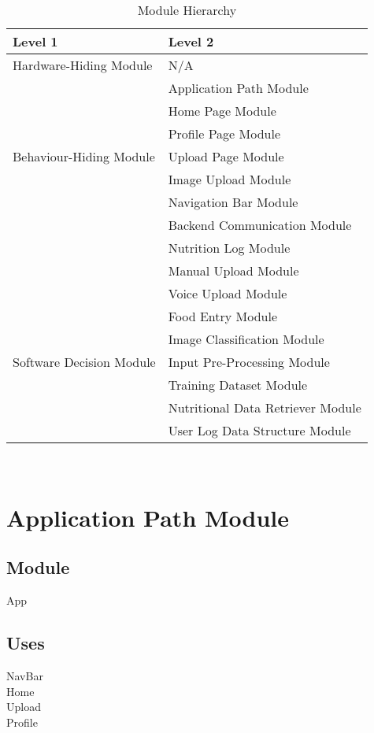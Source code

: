 \documentclass[12pt, titlepage]{article}
\begin{document}
\begin{table}[h!]
\centering
\begin{tabular}{p{} p{}}
	\toprule
	\textbf{Level 1} & \textbf{Level 2}\\
	\midrule
	
	{Hardware-Hiding Module} & N/A \\
	\midrule
	
	\multirow{7}{0.3\textwidth}{Behaviour-Hiding Module} & Application Path Module\\
	& Home Page Module\\
	& Profile Page Module\\
	& Upload Page Module\\
	& Image Upload Module\\
	& Navigation Bar Module\\
	& Backend Communication Module\\ 
	& Nutrition Log Module\\
	& Manual Upload Module \\
	& Voice Upload Module \\
	& Food Entry Module \\
	\midrule
	
	\multirow{3}{0.3\textwidth}{Software Decision Module} & Image Classification Module\\
	& Input Pre-Processing Module\\
	& Training Dataset Module\\
	& Nutritional Data Retriever Module\\
	& User Log Data Structure Module\\
	\bottomrule
	
\end{tabular}
\caption{Module Hierarchy}
\label{TblMH}
\end{table}

\newpage
~\newpage

\section{Application Path Module} \label{App}
\subsection{Module}
App
\subsection{Uses}
NavBar\\
Home\\
Upload\\
Profile
\end{document}
